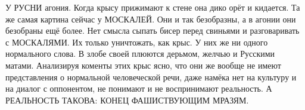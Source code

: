  
 
 
 
 

У РУСНИ агония. Когда крысу прижимают к стене она дико орёт и кидается. Та же
самая картина сейчас у МОСКАЛЕЙ. Они и так безобразны, а в агонии они безобраны
ещё более. Нет смысла сыпать бисер перед свиньями и разговаривать с МОСКАЛЯМИ.
Их только уничтожать, как крыс. У них же ни одного нормального слова. В злобе
своей плюются дерьмом, желчью и Русскими матами. Анализируя коменты этих крыс
ясно, что они же вообще не имеют представления о нормальной человеческой речи,
даже намёка нет на культуру и на диалог с оппонентом, не понимают и не
воспринимают реальность. А РЕАЛЬНОСТЬ ТАКОВА: КОНЕЦ ФАШИСТВУЮЩИМ МРАЗЯМ. 
